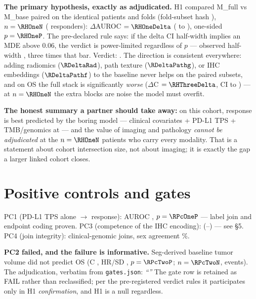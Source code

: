 \documentclass[11pt,a4paper]{article}
\begin{document}
\textbf{The primary hypothesis, exactly as adjudicated.} H1 compared M\_full vs M\_base paired
on the identical patients and folds (fold-subset hash \texttt{\RFoldHash}), $n=\RHOneN$
(\RHOnePos{} responders): $\Delta$AUROC $= \RHOneDelta$ (\RHOneDeltaLo{} to \RHOneDeltaHi),
one-sided $p=\RHOneP$. The pre-declared rule says: if the delta CI half-width implies an MDE
above 0.06, the verdict is power-limited regardless of $p$ --- observed half-width
\RHOneHalfwidth, three times that bar. Verdict: \textbf{\RVerdict}. The direction is
consistent everywhere: adding radiomics ($\RDeltaRad$), path texture ($\RDeltaPathg$), or IHC
embeddings ($\RDeltaPathf$) to the baseline never helps on the paired subsets, and on OS the
full stack is significantly \emph{worse} ($\Delta$C $= \RHThreeDelta$, CI \RHThreeDeltaLo{}
to \RHThreeDeltaHi) --- at $n=\RHOneN$ the extra blocks are noise the model must overfit.

\begin{center}
\small

\end{center}

\textbf{The honest summary a partner should take away:} on this cohort, response is best
predicted by the boring model --- clinical covariates + PD-L1 TPS + TMB/genomics at
\RBaseAuroc{} --- and the value of imaging and pathology \emph{cannot be adjudicated} at the
$n=\RHOneN$ patients who carry every modality. That is a statement about cohort intersection
size, not about imaging; it is exactly the gap a larger linked cohort closes.

\section{Positive controls and gates}

PC1 (PD-L1 TPS alone $\rightarrow$ response): AUROC \RPcOneAuroc, $p=\RPcOneP$ --- label join
and endpoint coding proven. PC3 (competence of the IHC encoding): \RPcThreeAuroc{}
(\RPcThreeLo--\RPcThreeHi) --- see \S5. PC4 (join integrity): \RPcFourJoin{} clinical-genomic
joins, sex agreement \RPcFourSex\%.

\textbf{PC2 failed, and the failure is informative.} Seg-derived baseline tumor volume did not
predict OS (C \RPcTwoC, HR/SD \RPcTwoHr, $p=\RPcTwoP$; $n=\RPcTwoN$, \RPcTwoEvents{} events).
The adjudication, verbatim from \texttt{gates.json}: \emph{``''}
The gate row is retained as FAIL rather than reclassified; per the pre-registered verdict
rules it participates only in H1 \emph{confirmation}, and H1 is a null regardless.
\end{document}
